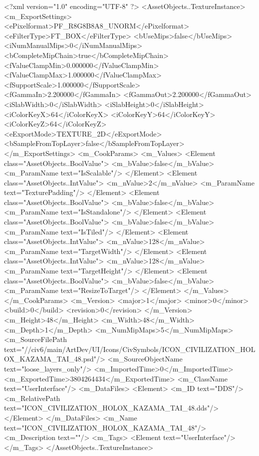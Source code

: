 <?xml version="1.0" encoding="UTF-8" ?>
<AssetObjects..TextureInstance>
	<m_ExportSettings>
		<ePixelformat>PF_R8G8B8A8_UNORM</ePixelformat>
		<eFilterType>FT_BOX</eFilterType>
		<bUseMips>false</bUseMips>
		<iNumManualMips>0</iNumManualMips>
		<bCompleteMipChain>true</bCompleteMipChain>
		<fValueClampMin>0.000000</fValueClampMin>
		<fValueClampMax>1.000000</fValueClampMax>
		<fSupportScale>1.000000</fSupportScale>
		<fGammaIn>2.200000</fGammaIn>
		<fGammaOut>2.200000</fGammaOut>
		<iSlabWidth>0</iSlabWidth>
		<iSlabHeight>0</iSlabHeight>
		<iColorKeyX>64</iColorKeyX>
		<iColorKeyY>64</iColorKeyY>
		<iColorKeyZ>64</iColorKeyZ>
		<eExportMode>TEXTURE_2D</eExportMode>
		<bSampleFromTopLayer>false</bSampleFromTopLayer>
	</m_ExportSettings>
	<m_CookParams>
		<m_Values>
			<Element class="AssetObjects..BoolValue">
				<m_bValue>false</m_bValue>
				<m_ParamName text="IsScalable"/>
			</Element>
			<Element class="AssetObjects..IntValue">
				<m_nValue>2</m_nValue>
				<m_ParamName text="TexturePadding"/>
			</Element>
			<Element class="AssetObjects..BoolValue">
				<m_bValue>false</m_bValue>
				<m_ParamName text="IsStandalone"/>
			</Element>
			<Element class="AssetObjects..BoolValue">
				<m_bValue>false</m_bValue>
				<m_ParamName text="IsTiled"/>
			</Element>
			<Element class="AssetObjects..IntValue">
				<m_nValue>128</m_nValue>
				<m_ParamName text="TargetWidth"/>
			</Element>
			<Element class="AssetObjects..IntValue">
				<m_nValue>128</m_nValue>
				<m_ParamName text="TargetHeight"/>
			</Element>
			<Element class="AssetObjects..BoolValue">
				<m_bValue>false</m_bValue>
				<m_ParamName text="ResizeToTarget"/>
			</Element>
		</m_Values>
	</m_CookParams>
	<m_Version>
		<major>1</major>
		<minor>0</minor>
		<build>0</build>
		<revision>0</revision>
	</m_Version>
	<m_Height>48</m_Height>
	<m_Width>48</m_Width>
	<m_Depth>1</m_Depth>
	<m_NumMipMaps>5</m_NumMipMaps>
	<m_SourceFilePath text="//civ6/main/ArtDev/UI/Icons/CivSymbols/ICON_CIVILIZATION_HOLOX_KAZAMA_TAI_48.psd"/>
	<m_SourceObjectName text="loose_layers_only"/>
	<m_ImportedTime>0</m_ImportedTime>
	<m_ExportedTime>3804264434</m_ExportedTime>
	<m_ClassName text="UserInterface"/>
	<m_DataFiles>
		<Element>
			<m_ID text="DDS"/>
			<m_RelativePath text="ICON_CIVILIZATION_HOLOX_KAZAMA_TAI_48.dds"/>
		</Element>
	</m_DataFiles>
	<m_Name text="ICON_CIVILIZATION_HOLOX_KAZAMA_TAI_48"/>
	<m_Description text=""/>
	<m_Tags>
		<Element text="UserInterface"/>
	</m_Tags>
</AssetObjects..TextureInstance>

